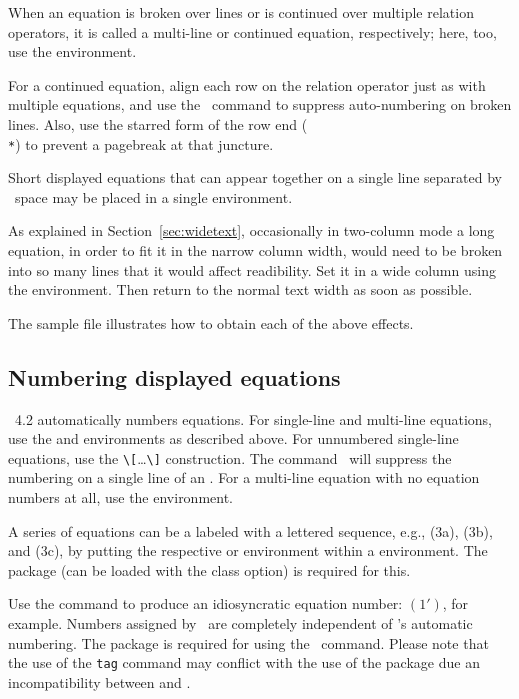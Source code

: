\documentclass[%
,aps%
 ,twocolumn%
 ,secnumarabic%
,amssymb, amsmath,nobibnotes, aps, prl, floatfix]{revtex4-2}
\begin{document}
When an equation is broken over lines or is continued over multiple
relation operators, it is called a multi-line or continued equation,
respectively; here, too, use the  environment.

For a continued equation, align each row on the relation operator just
as with multiple equations, and use the \cmd\nonumber\ command to
suppress auto-numbering on broken lines.  Also, use the starred form
of the row end (\cmd\\\verb+*+) to prevent a pagebreak at that
juncture.

Short displayed equations that can appear together on a single line
separated by \cmd\qquad\ space may be placed in a single
 environment.

As explained in Section~\ref{sec:widetext}, occasionally in two-column
mode a long equation, in order to fit it in the narrow column width,
would need to be broken into so many lines that it would affect
readibility. Set it in a wide column using the 
environment. Then return to the normal text width as soon as
possible.

The sample file  illustrates how to obtain each of
the above effects.

\subsection{Numbering displayed equations}

\revtex~4.2 automatically numbers equations.
For single-line and multi-line equations, use the
 and  environments as described above.
For unnumbered single-line equations, use the \verb+\[+\dots\verb+\]+
construction.  The command \cmd\nonumber\ will suppress the numbering
on a single line of an
.
For a multi-line equation with no equation numbers at all,
use the  environment.

A series of equations can be a labeled with a lettered sequence,
e.g., (3a), (3b), and (3c), by
putting the respective  or  environment within a
 environment. 
The  package (can be loaded with the
 class option) is required for this.

Use the command \cmd\tag{} to produce an idiosyncratic
equation number: $(1')$, for example.  Numbers assigned by \cmd\tag\
are completely independent of \revtex's automatic numbering.  The
package \classname{amsmath} is required for using the \cmd\tag\
command. Please
note that the use of the \texttt{tag} command may conflict with the use of the  package
due an incompatibility between  and . 
\end{document}
